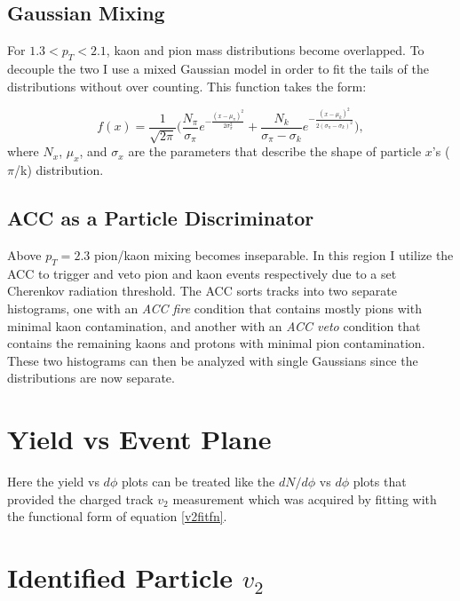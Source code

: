 \subsection{Gaussian Mixing}
For $1.3<p_T<2.1$, kaon and pion mass distributions become overlapped. To decouple the two I use a mixed Gaussian model in order to fit the tails of the distributions without over counting. This function takes the form:

\begin{equation}
f(x) = \frac{1}{\sqrt{2\pi}} \bigg( \frac{N_{\pi}}{\sigma_{\pi}} e^{-\frac{(x-\mu_{\pi})^2}{2\sigma_{\pi}^{2}}} + \frac{N_{k}}{\sigma_{\pi}-\sigma_{k}} e^{-\frac{(x-\mu_{k})^2}{2(\sigma_{\pi} - \sigma_{k})^{2}}} \bigg),
\end{equation}
where $N_{x}$, $\mu_x$, and $\sigma_x$ are the parameters that describe the shape of particle $x$'s ($\pi$/k) distribution. 

\subsection{ACC as a Particle Discriminator}
Above $p_T=2.3$ pion/kaon mixing becomes inseparable. In this region I utilize the ACC to trigger and veto pion and kaon events respectively due to a set Cherenkov radiation threshold. The ACC sorts tracks into two separate histograms, one with an \textit{ACC fire} condition that contains mostly pions with minimal kaon contamination, and another with an \textit{ACC veto} condition that contains the remaining kaons and protons with minimal pion contamination. These two histograms can then be analyzed with single Gaussians since the distributions are now separate.
\section{Yield vs Event Plane}
Here the yield vs $d\phi$ plots can be treated like the $dN/d\phi$ vs $d\phi$ plots that provided the charged track $v_2$ measurement which was acquired by fitting with the functional form of equation \ref{v2fitfn}. 
\section{Identified Particle $v_{2}$}

\pagebreak
\pagebreak

